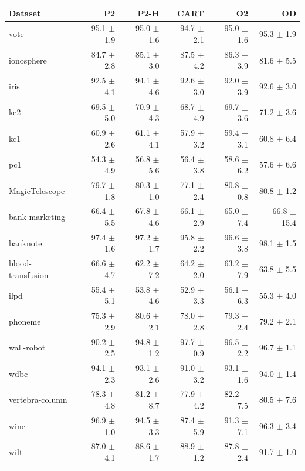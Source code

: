 \begin{tabular}{lrrrrr}
\toprule
Dataset & P2 & P2-H & CART & O2 & OD \\
\midrule
vote & 95.1 $\pm$ 1.9 & 95.0 $\pm$ 1.6 & 94.7 $\pm$ 2.1 & 95.0 $\pm$ 1.6 & 95.3 $\pm$ 1.9 \\
ionosphere & 84.7 $\pm$ 2.8 & 85.1 $\pm$ 3.0 & 87.5 $\pm$ 4.2 & 86.3 $\pm$ 3.9 & 81.6 $\pm$ 5.5 \\
iris & 92.5 $\pm$ 4.1 & 94.1 $\pm$ 4.6 & 92.6 $\pm$ 3.0 & 92.0 $\pm$ 3.9 & 92.6 $\pm$ 3.0 \\
kc2 & 69.5 $\pm$ 5.0 & 70.9 $\pm$ 4.3 & 68.7 $\pm$ 4.9 & 69.7 $\pm$ 3.6 & 71.2 $\pm$ 3.6 \\
kc1 & 60.9 $\pm$ 2.6 & 61.1 $\pm$ 4.1 & 57.9 $\pm$ 3.2 & 59.4 $\pm$ 3.1 & 60.8 $\pm$ 6.4 \\
pc1 & 54.3 $\pm$ 4.9 & 56.8 $\pm$ 5.6 & 56.4 $\pm$ 3.8 & 58.6 $\pm$ 6.2 & 57.6 $\pm$ 6.6 \\
MagicTelescope & 79.7 $\pm$ 1.8 & 80.3 $\pm$ 1.0 & 77.1 $\pm$ 2.4 & 80.8 $\pm$ 0.8 & 80.8 $\pm$ 1.2 \\
bank-marketing & 66.4 $\pm$ 5.5 & 67.8 $\pm$ 4.6 & 66.1 $\pm$ 2.9 & 65.0 $\pm$ 7.4 & 66.8 $\pm$ 15.4 \\
banknote & 97.4 $\pm$ 1.6 & 97.2 $\pm$ 1.7 & 95.8 $\pm$ 2.2 & 96.6 $\pm$ 3.8 & 98.1 $\pm$ 1.5 \\
blood-transfusion & 66.6 $\pm$ 4.7 & 62.2 $\pm$ 7.2 & 64.2 $\pm$ 2.0 & 63.2 $\pm$ 7.9 & 63.8 $\pm$ 5.5 \\
ilpd & 55.4 $\pm$ 5.1 & 53.8 $\pm$ 4.6 & 52.9 $\pm$ 3.3 & 56.1 $\pm$ 6.3 & 55.3 $\pm$ 4.0 \\
phoneme & 75.3 $\pm$ 2.9 & 80.6 $\pm$ 2.1 & 78.0 $\pm$ 2.8 & 79.3 $\pm$ 2.4 & 79.2 $\pm$ 2.1 \\
wall-robot & 90.2 $\pm$ 2.5 & 94.8 $\pm$ 1.2 & 97.7 $\pm$ 0.9 & 96.5 $\pm$ 2.2 & 96.7 $\pm$ 1.1 \\
wdbc & 94.1 $\pm$ 2.3 & 93.1 $\pm$ 2.6 & 91.0 $\pm$ 3.2 & 93.1 $\pm$ 1.6 & 94.0 $\pm$ 1.4 \\
vertebra-column & 78.3 $\pm$ 4.8 & 81.2 $\pm$ 8.7 & 77.9 $\pm$ 4.2 & 82.2 $\pm$ 7.5 & 80.5 $\pm$ 7.6 \\
wine & 96.9 $\pm$ 1.0 & 94.5 $\pm$ 3.3 & 87.4 $\pm$ 5.9 & 91.3 $\pm$ 7.1 & 96.3 $\pm$ 3.4 \\
wilt & 87.0 $\pm$ 4.1 & 88.6 $\pm$ 1.7 & 88.9 $\pm$ 1.2 & 87.8 $\pm$ 2.4 & 91.7 $\pm$ 1.0 \\
\bottomrule
\end{tabular}
